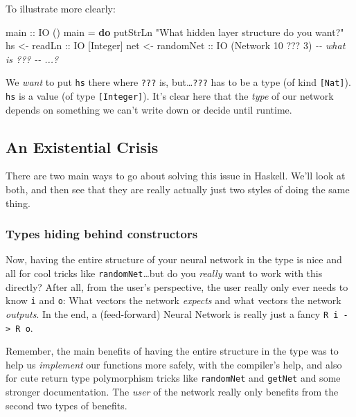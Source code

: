 \documentclass[]{article}
\newenvironment{Shaded}{}{}
\newcommand{\CommentTok}[1]{\textcolor[rgb]{0.38,0.63,0.69}{\textit{#1}}}
\newcommand{\DataTypeTok}[1]{\textcolor[rgb]{0.56,0.13,0.00}{#1}}
\newcommand{\DecValTok}[1]{\textcolor[rgb]{0.25,0.63,0.44}{#1}}
\newcommand{\FunctionTok}[1]{\textcolor[rgb]{0.02,0.16,0.49}{#1}}
\newcommand{\KeywordTok}[1]{\textcolor[rgb]{0.00,0.44,0.13}{\textbf{#1}}}
\newcommand{\NormalTok}[1]{#1}
\newcommand{\OperatorTok}[1]{\textcolor[rgb]{0.40,0.40,0.40}{#1}}
\newcommand{\OtherTok}[1]{\textcolor[rgb]{0.00,0.44,0.13}{#1}}
\newcommand{\StringTok}[1]{\textcolor[rgb]{0.25,0.44,0.63}{#1}}
\begin{document}
To illustrate more clearly:

\begin{Shaded}
\begin{Highlighting}[]
\OtherTok{main ::} \DataTypeTok{IO}\NormalTok{ ()}
\NormalTok{main }\OtherTok{=} \KeywordTok{do}
    \FunctionTok{putStrLn} \StringTok{"What hidden layer structure do you want?"}
\NormalTok{    hs  }\OtherTok{\textless{}{-} readLn    ::} \DataTypeTok{IO}\NormalTok{ [}\DataTypeTok{Integer}\NormalTok{]}
\NormalTok{    net }\OtherTok{\textless{}{-} randomNet ::} \DataTypeTok{IO}\NormalTok{ (}\DataTypeTok{Network} \DecValTok{10} \OperatorTok{???} \DecValTok{3}\NormalTok{)   }\CommentTok{{-}{-} what is ???}
    \CommentTok{{-}{-} ...?}
\end{Highlighting}
\end{Shaded}

We \emph{want} to put \texttt{hs} there where \texttt{???} is,
but\ldots{}\texttt{???} has to be a type (of kind \texttt{{[}Nat{]}}).
\texttt{hs} is a value (of type \texttt{{[}Integer{]}}). It's clear here that
the \emph{type} of our network depends on something we can't write down or
decide until runtime.

\subsection{An Existential Crisis}\label{an-existential-crisis}

There are two main ways to go about solving this issue in Haskell. We'll look at
both, and then see that they are really actually just two styles of doing the
same thing.

\subsubsection{Types hiding behind
constructors}\label{types-hiding-behind-constructors}

Now, having the entire structure of your neural network in the type is nice and
all for cool tricks like \texttt{randomNet}\ldots but do you \emph{really} want
to work with this directly? After all, from the user's perspective, the user
really only ever needs to know \texttt{i} and \texttt{o}: What vectors the
network \emph{expects} and what vectors the network \emph{outputs}. In the end,
a (feed-forward) Neural Network is really just a fancy
\texttt{R\ i\ -\textgreater{}\ R\ o}.

Remember, the main benefits of having the entire structure in the type was to
help us \emph{implement} our functions more safely, with the compiler's help,
and also for cute return type polymorphism tricks like \texttt{randomNet} and
\texttt{getNet} and some stronger documentation. The \emph{user} of the network
really only benefits from the second two types of benefits.
\end{document}
